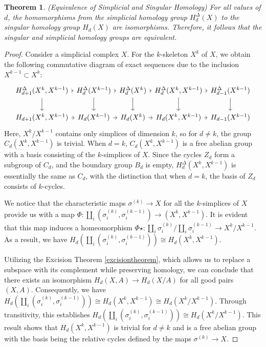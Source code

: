 \documentclass{amsart}
\newtheorem{theorem}{Theorem}
\begin{document}
\begin{theorem}{(Equivalence of Simplicial and Singular Homology)}
For all values of $d$, the homomorphisms from the simplicial homology group $H^\Delta_d(X)$ to the singular homology group $H_d(X)$ are isomorphisms. Therefore, it follows that the singular and simplicial homology groups are equivalent.
\end{theorem}

\begin{proof}
Consider a simplicial complex $X$. For the $k$-skeleton $X^k$ of $X$, we obtain the following commutative diagram of exact sequences due to the inclusion $X^{k-1} \subset X^k$:
\begin{equation*}
\begin{tikzcd}[column sep=0.3em]
{H^\Delta_{d+1}(X^k,X^{k-1})} \arrow[d] \arrow[r] & H^\Delta_{d}(X^{k-1}) \arrow[d] \arrow[r] & H^\Delta_{d}(X^k) \arrow[d] \arrow[r] & {H^\Delta_{d}(X^k,X^{k-1})} \arrow[d] \arrow[r] & H^\Delta_{d-1}(X^{k-1}) \arrow[d] \\
{H_{d+1}(X^k,X^{k-1})} \arrow[r]                  & H_{d}(X^{k-1}) \arrow[r]                  & H_{d}(X^k) \arrow[r]                  & {H_{d}(X^k,X^{k-1})} \arrow[r]                  & H_{d-1}(X^{k-1})                 
\end{tikzcd}
\end{equation*}
Here, $X^k/X^{k-1}$ contains only simplices of dimension $k$, so for $d \neq k$, the group $C_d(X^k, X^{k-1})$ is trivial. When $d = k$, $C_d(X^k, X^{k-1})$ is a free abelian group with a basis consisting of the $k$-simplices of $X$. Since the cycles $Z_d$ form a subgroup of $C_d$, and the boundary group $B_d$ is empty, $H^\Delta_d(X^k, X^{k-1})$ is essentially the same as $C_d$, with the distinction that when $d = k$, the basis of $Z_d$ consists of $k$-cycles.

We notice that the characteristic maps $\sigma^{(k)} \rightarrow X$ for all the $k$-simplices of $X$ provide us with a map $\Phi: \coprod_i(\sigma^{(k)}_i, \sigma^{(k-1)}_i) \rightarrow (X^k, X^{k-1})$. It is evident that this map induces a homeomorphism $\Phi\star: \coprod_i \sigma^{(k)}_i/\coprod_i \sigma^{(k-1)}_i \rightarrow X^k/X^{k-1}$. As a result, we have $H_d(\coprod_i (\sigma^{(k)}_i, \sigma^{(k-1)}_i)) \cong H_d(X^k, X^{k-1})$.

Utilizing the Excision Theorem \ref{excisiontheorem}, which allows us to replace a subspace with its complement while preserving homology, we can conclude that there exists an isomorphism $H_d(X,A) \rightarrow H_d(X/A)$ for all good pairs $(X,A)$. Consequently, we have $H_d(\coprod_i (\sigma^{(k)}_i, \sigma^{(k-1)}_i)) \cong H_d(X^k, X^{k-1}) \cong H_d(X^k/X^{k-1})$. Through transitivity, this establishes $H_d(\coprod_i (\sigma^{(k)}_i, \sigma^{(k-1)}_i)) \cong H_d(X^k/X^{k-1})$. This result shows that $H_d(X^k, X^{k-1})$ is trivial for $d \neq k$ and is a free abelian group with the basis being the relative cycles defined by the maps $\sigma^{(k)} \rightarrow X$.


\end{proof}
\end{document}
